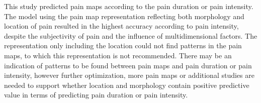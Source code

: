 \vspace{-0.2cm}
This study predicted pain maps according to the pain duration or pain intensity.
The model using the pain map representation reflecting both morphology and location of pain resulted in the highest accuracy according to pain intensity, despite the subjectivity of pain and the influence of multidimensional factors. The representation only including the location could not find patterns in the pain maps, to which this representation is not recommended. 
There may be an indication of patterns to be found between pain maps and pain duration or pain intensity, however further optimization, more pain maps or additional studies are needed to support whether location and morphology contain positive predictive value in terms of predicting pain duration or pain intensity.
